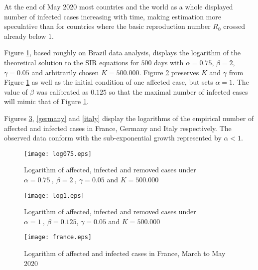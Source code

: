 \documentclass{article}
\begin{document}
At the end of May 2020 most countries and the world as a whole displayed number of infected cases increasing with time, making estimation more speculative than for countries where the basic reproduction number $R_0$ crossed already below $1$.

\bigskip

Figure \ref{log075}, based roughly on Brazil data analysis, displays the logarithm of the theoretical solution to the SIR equations for $500$ days with $\alpha=0.75$, $\beta=2$, $\gamma=0.05$ and arbitrarily chosen $K=500.000$. Figure \ref{log1} preserves $K$ and $\gamma$ from Figure \ref{log075} as well as the initial condition of one affected case, but sets $\alpha=1$. The value of $\beta$ was calibrated as $0.125$ so that the maximal number of infected cases will mimic that of Figure \ref{log075}.

Figures \ref{france}, \ref{germany} and \ref{italy} display the logarithms of the empirical number of affected and infected cases in France, Germany and Italy respectively. The observed data conform with the sub-exponential growth represented by $\alpha<1$.

\begin{figure}
\begin{center}
{\texttt{[image: log075.eps]}}
\end{center}
\caption{Logarithm of affected, infected and removed cases under $\alpha=0.75 \ , \ \beta=2 \ , \ \gamma=0.05$  and $K=500.000$}
\label{log075}
\end{figure}

\begin{figure}
\begin{center}
{\texttt{[image: log1.eps]}}
\end{center}
\caption{Logarithm of affected, infected and removed cases under $\alpha=1 \ , \ \beta=0.125$, $\gamma=0.05$ and $K=500.000$}
\label{log1}
\end{figure}

\bigskip

\begin{figure}
\begin{center}
{\texttt{[image: france.eps]}}
\end{center}
\caption{Logarithm of affected and infected cases in France, March to May 2020}
\label{france}
\end{figure}
\end{document}
